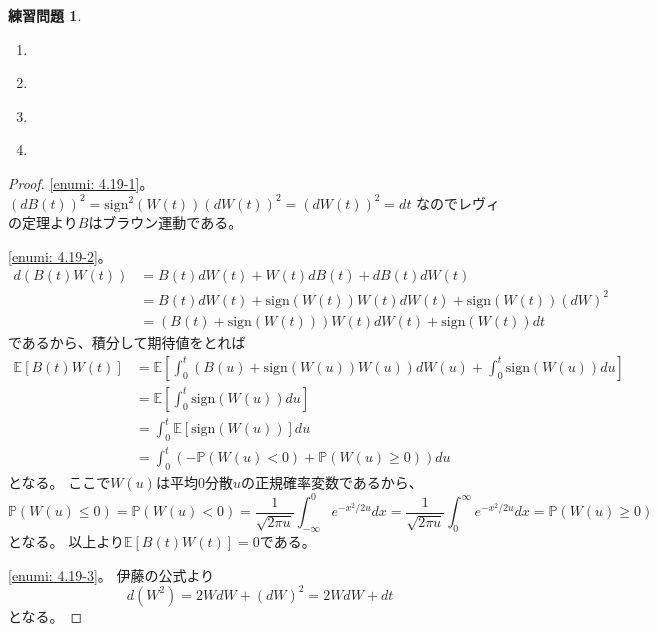 \documentclass[uplatex]{jsarticle}
\theoremstyle{definition}
\newtheorem{prob}[prob]{練習問題}
\def\P{\mathbb{P}}
\def\E{\mathbb{E}}
\begin{document}
\begin{prob}\label{prob: 4.19}
  \begin{enumerate}
    \item \label{enumi: 4.19-1}
    \item \label{enumi: 4.19-2}
    \item \label{enumi: 4.19-3}
    \item \label{enumi: 4.19-4}
  \end{enumerate}
\end{prob}

\begin{proof}
  \ref{enumi: 4.19-1}。
  \((dB(t))^2 = \mathrm{sign}^2(W(t))(dW(t))^2 = (dW(t))^2 = dt\)
  なのでレヴィの定理より\(B\)はブラウン運動である。

  \ref{enumi: 4.19-2}。
  \begin{align*}
    d(B(t)W(t)) &= B(t)dW(t) + W(t)dB(t) + dB(t)dW(t) \\
    &= B(t)dW(t) + \mathrm{sign}(W(t))W(t)dW(t)
    + \mathrm{sign}(W(t))(dW)^2 \\
    &= (B(t) + \mathrm{sign}(W(t)))W(t)dW(t) + \mathrm{sign}(W(t))dt
  \end{align*}
  であるから、積分して期待値をとれば
  \begin{align*}
    \E[B(t)W(t)]
    &= \E \left[ \int_0^t (B(u) + \mathrm{sign}(W(u))W(u))dW(u)
    + \int_0^t\mathrm{sign}(W(u))du \right] \\
    &= \E \left[ \int_0^t\mathrm{sign}(W(u))du \right] \\
    &= \int_0^t \E \left[ \mathrm{sign}(W(u)) \right] du \\
    &= \int_0^t \left( - \P(W(u)<0) + \P(W(u)\geq 0) \right) du
  \end{align*}
  となる。
  ここで\(W(u)\)は平均\(0\)分散\(u\)の正規確率変数であるから、
  \[
  \P(W(u) \leq 0) = \P(W(u) < 0)
  = \frac{1}{\sqrt{2\pi u}}\int_{-\infty}^0e^{-x^2/2u}dx
  = \frac{1}{\sqrt{2\pi u}}\int_0^\infty e^{-x^2/2u}dx
  = \P(W(u) \geq 0)
  \]
  となる。
  以上より\(\E[B(t)W(t)] = 0\)である。

  \ref{enumi: 4.19-3}。
  伊藤の公式より
  \[
  d(W^2) = 2WdW + (dW)^2 = 2WdW + dt
  \]
  となる。


\end{proof}
\end{document}
